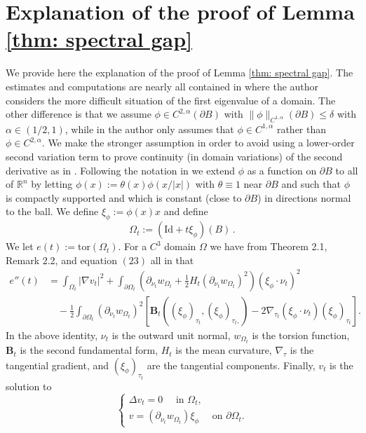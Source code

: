 \documentclass[10pt, reqno]{amsart}
\numberwithin{equation}{section}
\def\W{\Omega}
\def\tor{\mathrm{tor}}
\begin{document}
\section{Explanation of the proof of Lemma \ref{thm: spectral gap}}
 We provide here the explanation of the proof of Lemma \ref{thm: spectral gap}. The estimates and computations are nearly all contained in \cite{p24} where the author considers the more difficult situation of the first eigenvalue of a domain. The other difference is that we assume $\phi \in C^{2,\alpha}(\partial B)$ with $\| \phi \|_{C^{1,\alpha}}(\partial B) \leq \delta$ with  $\alpha \in (1/2,1)$, while in \cite{p24} the author only assumes that $\phi \in C^{1,\alpha}$ rather than $\phi \in C^{2,\alpha}$. We make the stronger assumption in order to avoid using a lower-order second variation term to prove continuity (in domain variations) of the second derivative as in \cite{p24}. Following the notation in \cite{p24} we extend $\phi$ as a function on $\partial B$ to all of $\mathbb{R}^n$ by letting $\phi(x):=\theta(x)\phi(x/|x|)$ with $\theta \equiv 1$ near $\partial B$ and such that $\phi$ is compactly supported and which is constant (close to $\partial B$) in directions normal to the ball. We define $\xi_{\phi}:=\phi(x)x$ and define 
\[
 \Omega_t := (\text{Id}+t\xi_{\phi})(B)\,.
\]
We let $e(t):=\tor(\Omega_t)$.  
For a $C^3$ domain $\Omega$ we have from Theorem 2.1, Remark 2.2, and equation $(23)$ all in \cite{dl19} that 
\begin{equation} \label{e:2ndvar}
\begin{aligned}
e''(t)&=\int_{\Omega_t} |\nabla v_t|^2 + \int_{\partial \Omega_t} (\partial_{\nu_t} w_{\Omega_t} + \frac{1}{2}H_t (\partial_{\nu_t} w_{\Omega_t})^2) (\xi_{\phi} \cdot \nu_t)^2\\
&\quad -\frac{1}{2}\int_{\partial \Omega_t}(\partial_{\nu_t}{w_{\Omega_t}})^2[\textbf{B}_t((\xi_{\phi})_{\tau_t},(\xi_{\phi})_{\tau_t, }) -2 \nabla_{\tau_t}(\xi_{\phi} \cdot \nu_t)(\xi_{\phi})_{\tau_t}]. 
\end{aligned}
\end{equation}
In the above identity, $\nu_t$ is the outward unit normal, $w_{\W_t}$ is the torsion function, $\textbf{B}_t$ is the second fundamental form, $H_t$ is the mean curvature, $\nabla_\tau$ is the tangential gradient, and $(\xi_{\phi})_{\tau_t}$ are the tangential components. Finally, $v_t$ is the solution to 
\[
\begin{cases}
 \Delta v_t =0 \quad \text{ in } \Omega_t, \\
 v= (\partial_{\nu_t} w_{\Omega_t}) \xi_\phi \quad \text{ on } \partial \Omega_t. 
\end{cases}
\]
\end{document}
